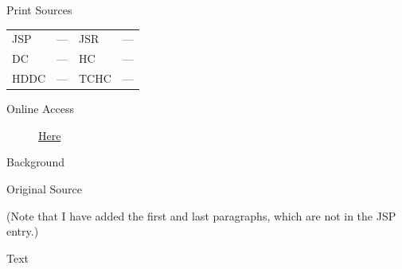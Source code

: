 			\begin{description}
				\item[Print Sources]
			\end{description}

			\begin{tabular}{p{0.5in}p{1in}p{0.5in}p{1in}}
				JSP	 	& ---		& JSR 		& --- \\
				DC	 	& ---		& HC 		& --- \\
				HDDC 	& ---		& TCHC 		& --- \\
			\end{tabular}
			
			\begin{description}
				\item[Online Access] \href{https://www.josephsmithpapers.org/paper-summary/discourse-5-february-1840/1}{Here}
			\end{description}
			
			\begin{description}
				\item[Background]
			\end{description}
			
			
			\begin{description}
				\item[Original Source]
			\end{description}
			
				(Note that I have added the first and last paragraphs, which are not in the JSP entry.)
			
			
			\begin{description}
				\item[Text]
			\end{description}
			
